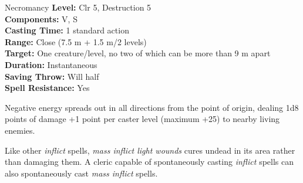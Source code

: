 {Necromancy}
{
	\textbf{Level:}
	Clr 5, Destruction 5\\
	\textbf{Components:}
	V, S\\
	\textbf{Casting Time:}
	1 standard action\\
	\textbf{Range:}
	Close (7.5 m + 1.5 m/2 levels)\\
	\textbf{Target:}
	One creature/level, no two of which can be more than 9 m apart\\
	\textbf{Duration:}
	Instantaneous\\
	\textbf{Saving Throw:}
	Will half\\
	\textbf{Spell Resistance:}
	Yes\\
}
{
	Negative energy spreads out in all directions from the point of origin, dealing 1d8 points of damage +1 point per caster level (maximum +25) to nearby living enemies.

	Like other \emph{inflict} spells, \emph{mass inflict light wounds} cures undead in its area rather than damaging them. A cleric capable of spontaneously casting \emph{inflict} spells can also spontaneously cast \emph{mass inflict} spells.

}
